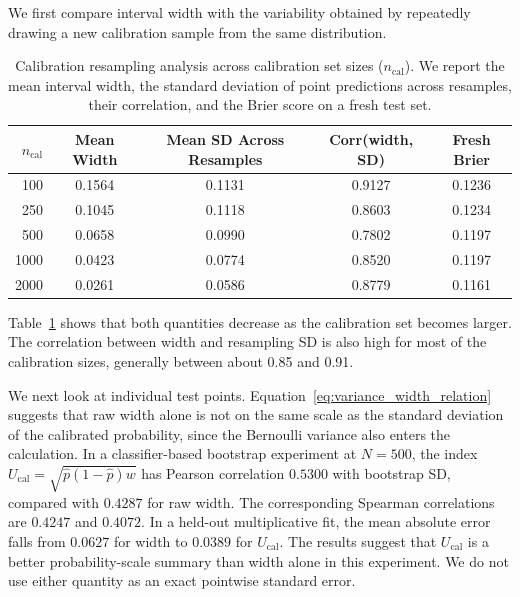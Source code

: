 \documentclass[11pt]{article}
\begin{document}
	We first compare interval width with the variability obtained by repeatedly drawing a new calibration sample from the same distribution.
	
	\begin{table}[ht]
		\centering
		\caption{Calibration resampling analysis across calibration set sizes ($n_{\text{cal}}$). We report the mean interval width, the standard deviation of point predictions across resamples, their correlation, and the Brier score on a fresh test set.}
		\label{tab:calibration_resampling}
		\vspace{8pt}
		\begin{tabular}{rcccc}
			\toprule
			$n_{\text{cal}}$ & Mean Width & Mean SD Across Resamples & Corr(width, SD) & Fresh Brier \\
			\midrule
			100 & 0.1564 & 0.1131 & 0.9127 & 0.1236 \\
			250 & 0.1045 & 0.1118 & 0.8603 & 0.1234 \\
			500 & 0.0658 & 0.0990 & 0.7802 & 0.1197 \\
			1000 & 0.0423 & 0.0774 & 0.8520 & 0.1197 \\
			2000 & 0.0261 & 0.0586 & 0.8779 & 0.1161 \\
			\bottomrule
		\end{tabular}
	\end{table}
	
	Table~\ref{tab:calibration_resampling} shows that both quantities decrease as the calibration set becomes larger. The correlation between width and resampling SD is also high for most of the calibration sizes, generally between about 0.85 and 0.91.
	
	We next look at individual test points. Equation~\ref{eq:variance_width_relation} suggests that raw width alone is not on the same scale as the standard deviation of the calibrated probability, since the Bernoulli variance also enters the calculation. In a classifier-based bootstrap experiment at $N = 500$, the index $U_{\mathrm{cal}}=\sqrt{\hat p(1-\hat p)w}$ has Pearson correlation $0.5300$ with bootstrap SD, compared with $0.4287$ for raw width. The corresponding Spearman correlations are $0.4247$ and $0.4072$. In a held-out multiplicative fit, the mean absolute error falls from $0.0627$ for width to $0.0389$ for $U_{\mathrm{cal}}$. The results suggest that $U_{\mathrm{cal}}$ is a better probability-scale summary than width alone in this experiment. We do not use either quantity as an exact pointwise standard error.
	
\end{document}
